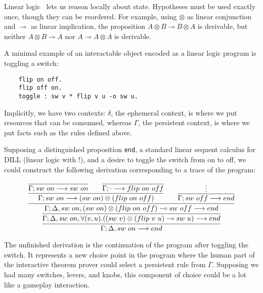 \newcommand{\lolli}{\multimap}

Linear logic~\cite{Girard87} lets us reason locally about state. Hypotheses
must be used exactly once, though they can be reordered. For example, using
$\otimes$ as linear conjunction and $\lolli$ as linear implication, the
proposition $A \otimes B \lolli B \otimes A$ is derivable, but neither $A
\otimes B \lolli A$ nor $A \lolli A \otimes A$ is derivable.

A minimal example of an interactable object encoded as a linear logic
program is toggling a switch:

\begin{verbatim}
    flip on off.
    flip off on.
    toggle : sw v * flip v u -o sw u.
\end{verbatim}

\noindent
Implicitly, we have two contexts: $\delta$, the ephemeral context, is where
we put resources that can be consumed, whereas $\Gamma$, the persistent
context, is where we put facts such as the rules defined above.

Supposing a distinguished proposition \verb|end|, a standard linear sequent
calculus for DILL (linear logic with $!$), and a desire to toggle the
switch from on to off, we could construct the following derivation
corresponding to a trace of the program:

{\small
\[
\infer
{
  \Gamma; \Delta, sw\ on \longrightarrow end
}
{
  \infer
  {
    \Gamma; \Delta, sw\ on, \forall(v,u).((sw\ v)\otimes (flip\ v\
    u)\multimap sw\ u)
    \longrightarrow end
  }
  {
  \infer
    {
    \Gamma; \Delta, sw\ on, (sw\ on)\otimes (flip\ on\ off)\multimap sw\
    off
    \longrightarrow end
    }
    {
        \infer{
          \Gamma; sw\ on \longrightarrow (sw\ on)\otimes(flip\ on\ off)
          }
          {
            \infer
            {\Gamma; sw\ on \longrightarrow sw\ on}
            {}
            \qquad
            \infer
            {\Gamma; \cdot \longrightarrow flip\ on\ off}
            {}
          }
        \qquad
        \infer{
          \Gamma; sw\ off \longrightarrow end
          }
          {\vdots
          }
    }
  }
}
\]
}

\noindent
The unfinished derivation is the continuation of the program after toggling
the switch. It represents a new choice point in the program where the human
part of the interactive theorem prover could select a persistent rule from
$\Gamma$.  Supposing we had many switches, levers, and knobs, this
component of choice could be a lot like a gameplay interaction.



% 
